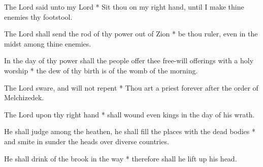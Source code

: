The Lord said unto my Lord * Sit thou on my right hand, until I make thine enemies thy footstool.

The Lord shall send the rod of thy power out of Zion * be thou ruler, even in the midst among thine enemies.

In the day of thy power shall the people offer thee free-will offerings with a holy worship * the dew of thy birth is of the womb of the morning.

The Lord sware, and will not repent * Thou art a priest forever after the order of Melchizedek.

The Lord upon thy right hand * shall wound even kings in the day of his wrath.

He shall judge among the heathen, he shall fill the places with the dead bodies * and smite in sunder the heads over diverse countries.

He shall drink of the brook in the way * therefore shall he lift up his head.